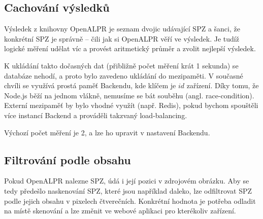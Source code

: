 \subsection{Cachování výsledků}

Výsledek z knihovny OpenALPR je seznam dvojic udávající SPZ a šanci, že konkrétní SPZ je správně --
čili jak si OpenALPR věří ve výsledek. Je tudíž logické měření udělat víc a provést aritmetický průměr a
zvolit nejlepší výsledek.

K ukládání takto dočasných dat (přibližně počet měření krát 1 sekunda) se databáze nehodí, a proto
bylo zavedeno ukládání do mezipaměti. V současné chvíli se využívá prostá paměť Backendu,
kde klíčem je $id$ zařízení. Díky tomu, že Node.js běží na jednom vlákně, nemusíme se bát souběhu
(angl. race-condition). Externí mezipaměť by bylo vhodné využít (např. Redis), pokud bychom spouštěli více
instancí Backend a prováděli takzvaný load-balancing.

Výchozí počet měření je 2, a lze ho upravit v nastavení Backendu.

\subsection{Filtrování podle obsahu}

Pokud OpenALPR nalezne SPZ, údá i její pozici v zdrojovém obrázku.
Aby se tedy předešlo naskenování SPZ, které jsou například daleko, lze odfiltrovat SPZ
podle jejich obsahu v pixelech čtverečních. Konkrétní hodnota je potřeba odladit na místě skenování a
lze změnit ve webové aplikaci pro kterékoliv zařízení.
